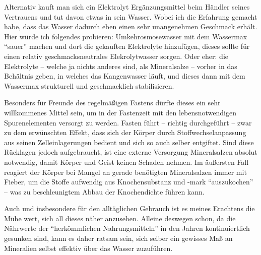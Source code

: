 \documentclass[a5paper,fontsize=10pt]{memoir}
\begin{document}
Alternativ kauft man sich ein Elektrolyt Ergänzungsmittel beim Händler seines Vertrauens und tut davon etwas in sein Wasser. Wobei ich die Erfahrung gemacht habe, dass das Wasser dadurch eben einen sehr unangenehmen Geschmack erhält. Hier würde ich folgendes probieren: Umkehrosmosewasser mit dem Wassermax ``sauer'' machen und dort die gekauften Elektrolyte hinzufügen, dieses sollte für einen relativ geschmacksneutrales Elekrolytwasser sorgen. Oder eher: die Elektrolyte -- welche ja nichts anderes sind, als Mineralsalze -- vorher in das Behältnis geben, in welches das Kangenwasser läuft, und dieses dann mit dem Wassermax strukturell und geschmacklich stabilisieren.

Besonders für Freunde des regelmäßigen Fastens dürfte dieses ein sehr willkommenes Mittel sein, um in der Fastenzeit mit den lebensnotwendigen Spurenelementen versorgt zu werden. Fasten führt -- richtig durchgeführt -- zwar zu dem erwünschten Effekt, dass sich der Körper durch Stoffwechselanpassung aus seinen Zelleinlagerungen bedient und sich so auch selber entgiftet. Sind diese Rücklagen jedoch aufgebraucht, ist eine externe Versorgung Mineralsalzen absolut notwendig, damit Körper und Geist keinen Schaden nehmen. Im äußersten Fall reagiert der Körper bei Mangel an gerade benötigten Mineralsalzen immer mit Fieber, um die Stoffe aufwendig aus Knochensubstanz und -mark ``auszukochen'' -- was zu beschleunigtem Abbau der Knochendichte führen kann.

Auch und insbesondere für den alltäglichen Gebrauch ist es meines Erachtens die Mühe wert, sich all dieses näher anzusehen. Alleine deswegen schon, da die Nährwerte der ``herkömmlichen Nahrungsmitteln'' in den Jahren kontinuiertlich gesunken sind, kann es daher ratsam sein, sich selber ein gewisses Maß an Mineralien selbst effektiv über das Wasser zuzuführen.


\end{document}
